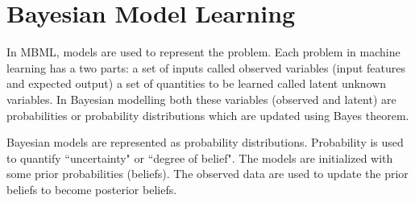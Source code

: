 \section{Bayesian Model Learning}

In MBML, models are used to represent the problem. Each problem in machine learning has a two parts: a set of inputs called observed variables (input features and expected output) a set of  quantities to be learned called latent unknown variables. In Bayesian modelling both these variables (observed and latent) are probabilities or probability distributions which are updated using Bayes theorem. 

Bayesian models are represented as probability distributions. Probability is used to quantify ``uncertainty" or ``degree of belief". The models are initialized with some prior probabilities  (beliefs). The observed data are used to update the prior beliefs to become posterior beliefs.
